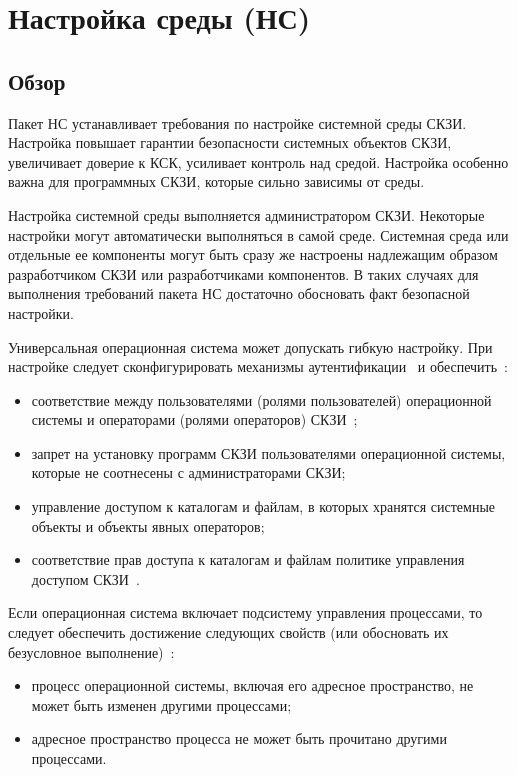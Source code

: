 \section{Настройка среды (НС)}\label{ES}

\subsection{Обзор}\label{ES.Defs}

Пакет НС устанавливает требования по настройке системной среды СКЗИ.
%
Настройка повышает гарантии безопасности системных объектов СКЗИ,
увеличивает доверие к КСК, усиливает контроль над средой.
%
Настройка особенно важна для программных СКЗИ, которые сильно зависимы от 
среды.

Настройка системной среды выполняется администратором СКЗИ.
Некоторые настройки могут автоматически выполняться в самой среде. 
%
Системная среда или отдельные ее компоненты могут быть сразу же 
настроены надлежащим образом разработчиком СКЗИ или разработчиками компонентов.  
%
В таких случаях для выполнения требований пакета НС достаточно обосновать факт 
безопасной настройки.

Универсальная операционная система может допускать гибкую настройку.
При настройке следует сконфигурировать механизмы 
аутентификации~ и
обеспечить~:
\begin{itemize}
\item
соответствие между пользователями (ролями пользователей) 
операционной системы и операторами (ролями операторов) 
СКЗИ~;
\item
запрет на установку программ СКЗИ пользователями операционной системы,
которые не соотнесены с администраторами СКЗИ;
\item
управление доступом к каталогам и файлам, в которых хранятся 
системные объекты и объекты явных операторов;
\item
соответствие прав доступа к каталогам и файлам 
политике управления доступом СКЗИ~.
\end{itemize}

Если операционная система включает подсистему управления процессами,
то следует обеспечить достижение следующих свойств 
(или обосновать их безусловное выполнение)~:
\begin{itemize}
\item
процесс операционной системы, включая его адресное пространство, не может быть 
изменен другими процессами;
\item
адресное пространство процесса не может быть прочитано другими процессами.
\end{itemize}

